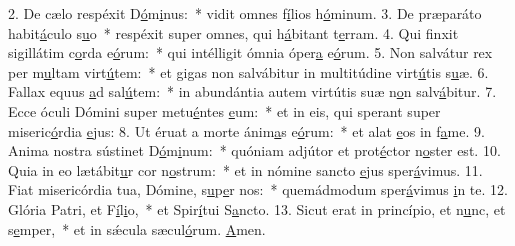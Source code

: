 2. De cælo respéxit D\uline{ó}m\uline{i}nus:~* vidit omnes f\uline{í}lios h\uline{ó}minum.
3. De præparáto habit\uline{á}culo s\uline{u}o~* respéxit super omnes, qui h\uline{á}bitant t\uline{e}rram.
4. Qui finxit sigillátim c\uline{o}rda e\uline{ó}rum:~* qui intélligit ómnia óper\uline{a} e\uline{ó}rum.
5. Non salvátur rex per m\uline{u}ltam virt\uline{ú}tem:~* et gigas non salvábitur in multitúdine virt\uline{ú}tis s\uline{u}æ.
6. Fallax equus \uline{a}d sal\uline{ú}tem:~* in abundántia autem virtútis suæ n\uline{o}n salv\uline{á}bitur.
7. Ecce óculi Dómini super metu\uline{é}ntes \uline{e}um:~* et in eis, qui sperant super miseric\uline{ó}rdia \uline{e}jus:
8. Ut éruat a morte ánim\uline{a}s e\uline{ó}rum:~* et alat \uline{e}os in f\uline{a}me.
9. Anima nostra sústinet D\uline{ó}m\uline{i}num:~* quóniam adjútor et prot\uline{é}ctor n\uline{o}ster est.
10. Quia in eo lætábit\uline{u}r cor n\uline{o}strum:~* et in nómine sancto \uline{e}jus sper\uline{á}vimus.
11. Fiat misericórdia tua, Dómine, s\uline{u}p\uline{e}r nos:~* quemádmodum sper\uline{á}vimus \uline{i}n te.
12. Glória Patri, et F\uline{í}l\uline{i}o,~* et Spir\uline{í}tui S\uline{a}ncto.
13. Sicut erat in princípio, et n\uline{u}nc, et s\uline{e}mper,~* et in sǽcula sæcul\uline{ó}rum. \uline{A}men.
